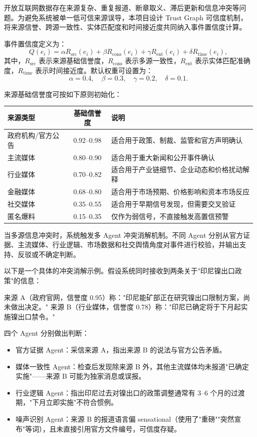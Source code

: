 ﻿\documentclass[12pt,a4paper]{article}
\begin{document}
开放互联网数据存在来源复杂、重复报道、断章取义、滞后更新和信息冲突等问题。为避免系统被单一低可信来源误导，本项目设计 Trust Graph 可信度机制，将来源信誉、跨源一致性、实体匹配度和时间接近度共同纳入事件置信度计算。

事件置信度定义为：
\begin{equation}
Q(e_i)=
\alpha R_{\text{src}}(e_i)
+
\beta R_{\text{cons}}(e_i)
+
\gamma R_{\text{ent}}(e_i)
+
\delta R_{\text{time}}(e_i),
\end{equation}
其中，$R_{\text{src}}$ 表示来源基础信誉度，$R_{\text{cons}}$ 表示多源一致性，$R_{\text{ent}}$ 表示实体匹配准确度，$R_{\text{time}}$ 表示时间接近度。默认权重可设置为：
\begin{equation}
\alpha=0.4,\quad \beta=0.3,\quad \gamma=0.2,\quad \delta=0.1.
\end{equation}

来源基础信誉度可按如下原则初始化：
\begin{center}
\begin{tabularx}{0.95\linewidth}{>{\raggedright\arraybackslash}X c >{\raggedright\arraybackslash}X}
\toprule
来源类型 & 基础信誉度 & 说明 \\
\midrule
政府机构/官方公告 & 0.92--0.98 & 适合用于政策、制裁、监管和官方声明确认 \\
主流媒体 & 0.80--0.90 & 适合用于重大新闻和公开事件确认 \\
行业媒体 & 0.70--0.82 & 适合用于产业链细节、企业动态和价格扰动解释 \\
金融媒体 & 0.68--0.80 & 适合用于市场预期、价格影响和资本市场反应 \\
社交媒体 & 0.35--0.55 & 适合用于早期信号发现，但需要交叉验证 \\
匿名爆料 & 0.15--0.35 & 仅作为弱信号，不直接触发高置信预警 \\
\bottomrule
\end{tabularx}
\end{center}

当多源信息冲突时，系统触发多 Agent 冲突消解机制。不同 Agent 分别从官方证据、主流媒体、行业逻辑、市场数据和社交舆情角度对事件进行校验，并输出支持、反驳或不确定判断。

以下是一个具体的冲突消解示例。假设系统同时接收到两条关于"印尼镍出口政策"的信息：

来源 A（政府官网，信誉度 0.95）称："印尼能矿部正在研究镍出口限制方案，尚未做出决定。"
来源 B（行业媒体，信誉度 0.78）称："印尼已确定将于下月起实施镍出口禁令。"

四个 Agent 分别做出判断：
\begin{itemize}
    \item 官方证据 Agent：采信来源 A，指出来源 B 的说法与官方公告矛盾。
    \item 媒体一致性 Agent：检查后发现除来源 B 外，其他主流媒体均未报道"已确定实施"——来源 B 可能为独家消息或误报。
    \item 行业逻辑 Agent：指出印尼过去对镍出口的政策调整通常有 3--6 个月的过渡期，"下月立即实施"不符合惯例。
    \item 噪声识别 Agent：来源 B 的报道语言偏 sensational（使用了"重磅""突然宣布"等词），且未直接引用官方文件编号，可信度存疑。
\end{itemize}
\end{document}
